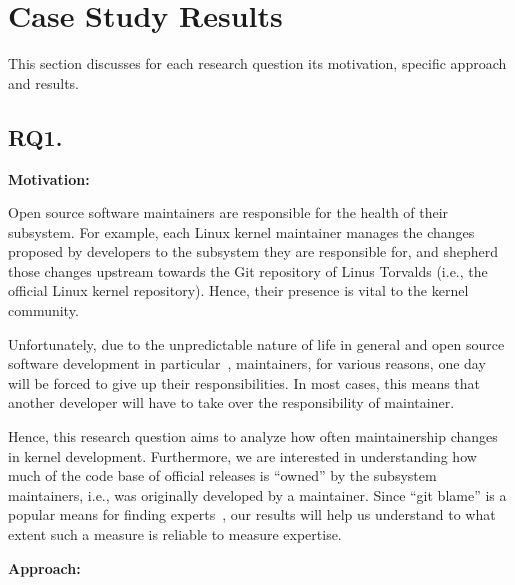 \section{Case Study Results}
\label{sec:case-study-results}

This section discusses for each research question its motivation, specific approach and results.

\subsection*{RQ1. \rqone}
\label{sec:rq1.-how-does}

{\bf Motivation:} 

Open source software maintainers are responsible for the health of their subsystem. For example, each Linux kernel maintainer %
manages the changes proposed by developers to the subsystem they are responsible for, and shepherd those changes upstream towards the Git repository of Linus Torvalds (i.e., the official Linux kernel repository). Hence, their presence is vital to the kernel community.

Unfortunately, due to the unpredictable nature of life in general and open source software development in particular~\citep{Wu-oss,Zhou}, maintainers, for various reasons, one day will be forced to give up their responsibilities. In most cases, this means that another developer will have to take over the responsibility of maintainer.

Hence, this research question aims to analyze how often maintainership changes in kernel development. Furthermore, we are interested in understanding how much of the code base of official releases is ``owned'' by the subsystem maintainers, i.e., was originally developed by a maintainer. Since ``git blame'' is a popular means for finding experts~\citep{Rahman-2011}, our results will help us understand to what extent such a measure is reliable to measure expertise.%

{\bf Approach:}

